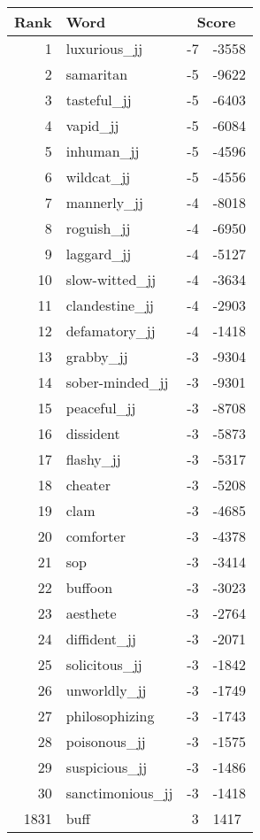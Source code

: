 \begin{longtable}[!htbp]{| rlr@{.}l |}
    \hline
    \textbf{Rank} & \textbf{Word} & \multicolumn{2}{c|}{\textbf{Score}} \\
    \hline
    \endhead
    1 & luxurious\_jj & -7 & -3558 \\
    2 & samaritan & -5 & -9622 \\
    3 & tasteful\_jj & -5 & -6403 \\
    4 & vapid\_jj & -5 & -6084 \\
    5 & inhuman\_jj & -5 & -4596 \\
    6 & wildcat\_jj & -5 & -4556 \\
    7 & mannerly\_jj & -4 & -8018 \\
    8 & roguish\_jj & -4 & -6950 \\
    9 & laggard\_jj & -4 & -5127 \\
    10 & slow-witted\_jj & -4 & -3634 \\
    11 & clandestine\_jj & -4 & -2903 \\
    12 & defamatory\_jj & -4 & -1418 \\
    13 & grabby\_jj & -3 & -9304 \\
    14 & sober-minded\_jj & -3 & -9301 \\
    15 & peaceful\_jj & -3 & -8708 \\
    16 & dissident & -3 & -5873 \\
    17 & flashy\_jj & -3 & -5317 \\
    18 & cheater & -3 & -5208 \\
    19 & clam & -3 & -4685 \\
    20 & comforter & -3 & -4378 \\
    21 & sop & -3 & -3414 \\
    22 & buffoon & -3 & -3023 \\
    23 & aesthete & -3 & -2764 \\
    24 & diffident\_jj & -3 & -2071 \\
    25 & solicitous\_jj & -3 & -1842 \\
    26 & unworldly\_jj & -3 & -1749 \\
    27 & philosophizing & -3 & -1743 \\
    28 & poisonous\_jj & -3 & -1575 \\
    29 & suspicious\_jj & -3 & -1486 \\
    30 & sanctimonious\_jj & -3 & -1418 \\
    1831 & buff & 3 & 1417 \\

\end{longtable}
